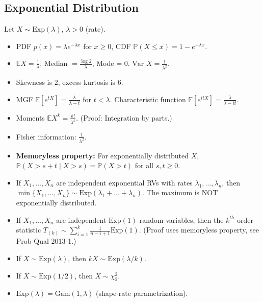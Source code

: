 \documentclass[twoside]{article}
\newcommand{\dis}{\displaystyle}
\newcommand\bbE{\mathbb{E}}
\newcommand\bbP{\mathbb{P}}
\newcommand\lmb{\lambda}
\newcommand\var{\text{Var }}
\begin{document}
\subsection{Exponential Distribution}
Let $X \sim \text{Exp}(\lmb)$, $\lmb > 0$ (rate).
\begin{itemize}
\item PDF $p(x) = \lmb e^{-\lmb x}$ for $x \geq 0$, CDF $\bbP(X \leq x) = 1 - e^{-\lmb x}$.

\item $\bbE X = \displaystyle\frac{1}{\lmb}$, Median $= \displaystyle\frac{\log 2}{\lmb}$, Mode = 0. $\var X = \displaystyle\frac{1}{\lmb^2}$.

\item Skewness is 2, excess kurtosis is 6.

\item MGF $\bbE [e^{tX}] = \displaystyle\frac{\lmb}{\lmb - t}$ for $t < \lmb$. Characteristic function $\bbE [e^{itX}] = \displaystyle\frac{\lmb}{\lmb - it}$.

\item Moments $\bbE X^k = \displaystyle\frac{k!}{\lmb^k}$. (Proof: Integration by parts.)

\item Fisher information: $\displaystyle\frac{1}{\lmb^2}$.

\item \textbf{Memoryless property:} For exponentially distributed $X$, $\bbP(X > s + t \mid X > s) = \bbP(X > t)$ for all $s,t \geq 0$.

\item If $X_1, \dots, X_n$ are independent exponential RVs with rates $\lmb_1, \dots, \lmb_n$, then $\min \{ X_1, \dots, X_n\} \sim \text{Exp}(\lmb_1 + \dots + \lmb_n)$. The maximum is NOT exponentially distributed.

\item If $X_1, \dots, X_n$ are independent $\text{Exp}(1)$ random variables, then the $k^{th}$ order statistic $T_{(k)} \sim \dis\sum_{i=1}^k\frac{1}{n-i+1} \text{Exp}(1)$. (Proof uses memoryless property, see Prob Qual 2013-1.)

\item If $X \sim \text{Exp}(\lmb)$, then $kX \sim \text{Exp}(\lmb / k)$.

\item If $X \sim \text{Exp}(1/2)$, then $X \sim \chi_2^2$.

\item $\text{Exp}(\lmb) = \text{Gam}(1, \lmb)$ (shape-rate parametrization).


\end{itemize}
\end{document}

